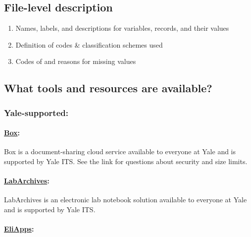 \documentclass[]{article}
\begin{document}
\subsection{File-level description}\label{file-level-description}

\begin{enumerate}
\def\labelenumi{\arabic{enumi}.}
\itemsep1pt\parskip0pt
\item
  Names, labels, and descriptions for variables, records, and their
  values
\item
  Definition of codes \& classification schemes used
\item
  Codes of and reasons for missing values
\end{enumerate}

\subsection{What tools and resources are
available?}\label{what-tools-and-resources-are-available-1}

\subsubsection{Yale-supported:}\label{yale-supported}

\paragraph{\href{http://its.yale.edu/services/collaboration-and-file-sharing/box-yale}{Box}:}\label{box}

Box is a document-sharing cloud service available to everyone at Yale
and is supported by Yale ITS. See the link for questions about security
and size limits.

\paragraph{\href{http://its.yale.edu/services/research-technologies/elab-notebook/labarchives-faqs}{LabArchives}:}\label{labarchives}

LabArchives is an electronic lab notebook solution available to everyone
at Yale and is supported by Yale ITS.

\paragraph{\href{http://its.yale.edu/services/email-and-calendars/eliapps-google-apps-education}{EliApps}:}\label{eliapps}
\end{document}
